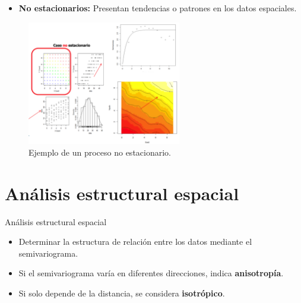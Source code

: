 \documentclass[
  10pt,
  ignorenonframetext,
]{beamer}
\providecommand{\tightlist}{%
  \setlength{\itemsep}{0pt}\setlength{\parskip}{0pt}}
\begin{document}
\begin{frame}
\begin{itemize}
\tightlist
\item
  \textbf{No estacionarios:} Presentan tendencias o patrones en los
  datos espaciales.
\end{itemize}

\begin{figure}
    \centering
    \includegraphics[width=0.6\textwidth]{./imagenes/figura3b.png}
    \caption{Ejemplo de un proceso no estacionario.}
\end{figure}
\end{frame}

\section{Análisis estructural
espacial}\label{anuxe1lisis-estructural-espacial}

\begin{frame}{Análisis estructural espacial}
\begin{itemize}
\tightlist
\item
  Determinar la estructura de relación entre los datos mediante el
  semivariograma.
\item
  Si el semivariograma varía en diferentes direcciones, indica
  \textbf{anisotropía}.
\item
  Si solo depende de la distancia, se considera \textbf{isotrópico}.
\end{itemize}
\end{frame}
\end{document}

